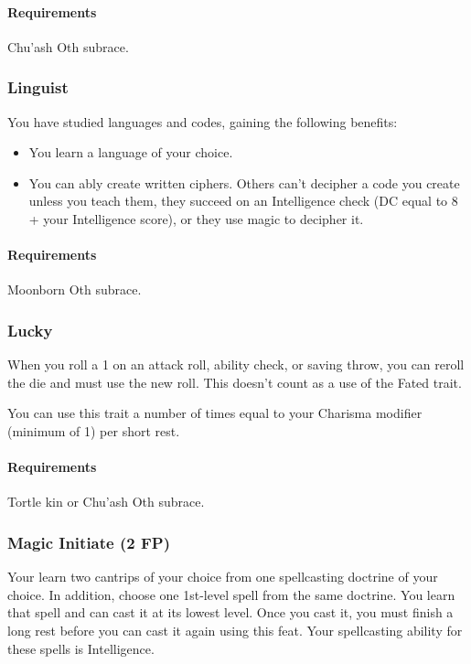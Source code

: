         \paragraph{Requirements} Chu'ash Oth subrace.
    \subsubsection{Linguist} \label{feat::linguist}
        You have studied languages and codes, gaining the following benefits:
        \begin{itemize}
            \item You learn a language of your choice.
            \item You can ably create written ciphers.
            Others can't decipher a code you create unless you teach them, they succeed on an Intelligence check (DC equal to 8 + your Intelligence score), or they use magic to decipher it. %
        \end{itemize}
        \paragraph{Requirements} Moonborn Oth subrace.
    \subsubsection{Lucky} \label{feat::lucky}
        When you roll a 1 on an attack roll, ability check, or saving throw, you can reroll the die and must use the new roll.
        This doesn't count as a use of the Fated trait.

        You can use this trait a number of times equal to your Charisma modifier (minimum of 1) per short rest.
        \paragraph{Requirements} Tortle kin or Chu'ash Oth subrace.
    \subsubsection{Magic Initiate (2 FP)} \label{feat::magicinitiate} %
        Your learn two cantrips of your choice from one spellcasting doctrine of your choice.
        In addition, choose one 1st-level spell from the same doctrine.
        You learn that spell and can cast it at its lowest level.
        Once you cast it, you must finish a long rest before you can cast it again using this feat.
        Your spellcasting ability for these spells is Intelligence.
